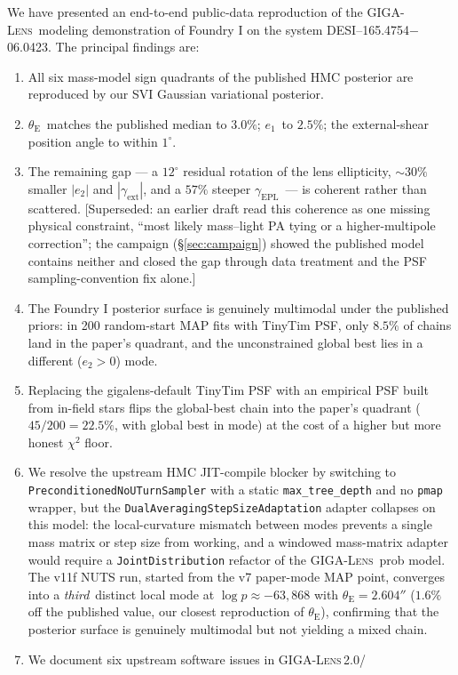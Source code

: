 \documentclass[11pt,letterpaper]{article}
\newcommand{\thetaE}{\ensuremath{\theta_{\mathrm{E}}}}
\newcommand{\gammaEPL}{\ensuremath{\gamma_{\mathrm{EPL}}}}
\newcommand{\gext}{\ensuremath{\gamma_{\mathrm{ext}}}}
\newcommand{\eone}{\ensuremath{e_{1}}}
\newcommand{\etwo}{\ensuremath{e_{2}}}
\newcommand{\foundry}{DESI--165.4754$-$06.0423}
\newcommand{\gigalens}{\textsc{GIGA-Lens}}
\begin{document}
We have presented an end-to-end public-data reproduction of the
\gigalens\ modeling demonstration of Foundry I \citep{huang2025foundry1}
on the system \foundry. The principal findings are:
\begin{enumerate}
\item All six mass-model sign quadrants of the published HMC posterior
are reproduced by our SVI Gaussian variational posterior.
\item \thetaE\ matches the published median to $3.0\%$; \eone\ to
$2.5\%$; the external-shear position angle to within $1^{\circ}$.
\item The remaining gap --- a $12^{\circ}$ residual rotation of the
lens ellipticity, $\sim30\%$ smaller $|\etwo|$ and $|\gext|$, and a
$57\%$ steeper \gammaEPL\ --- is coherent rather than scattered.
[Superseded: an earlier draft read this coherence as one missing
physical constraint, ``most likely mass--light PA tying or a
higher-multipole correction''; the campaign (\S\ref{sec:campaign})
showed the published model contains neither and closed the gap through
data treatment and the PSF sampling-convention fix alone.]
\item The Foundry I posterior surface is genuinely multimodal under
the published priors: in 200 random-start MAP fits with TinyTim PSF,
only $8.5\%$ of chains land in the paper's quadrant, and the
unconstrained global best lies in a different ($\etwo>0$) mode.
\item Replacing the gigalens-default TinyTim PSF with an empirical
PSF built from in-field stars flips the global-best chain into the
paper's quadrant ($45/200=22.5\%$, with global best in mode) at the
cost of a higher but more honest $\chi^{2}$ floor.
\item We resolve the upstream HMC JIT-compile blocker by switching
to \texttt{PreconditionedNoUTurnSampler} with a static
\texttt{max\_tree\_depth} and no \texttt{pmap} wrapper, but the
\texttt{DualAveragingStepSizeAdaptation} adapter collapses on this
model: the local-curvature mismatch between modes prevents a single
mass matrix or step size from working, and a windowed mass-matrix
adapter would require a \texttt{JointDistribution} refactor of the
\gigalens\ prob model. The v11f NUTS run, started from the v7
paper-mode MAP point, converges into a {\it third}\ distinct local
mode at $\log p\approx -63{,}868$ with $\thetaE=2.604''$ ($1.6\%$ off
the published value, our closest reproduction of \thetaE), confirming
that the posterior surface is genuinely multimodal but not yielding a
mixed chain.
\item We document six upstream software issues in \gigalens\,2.0/

\end{enumerate}
\end{document}
